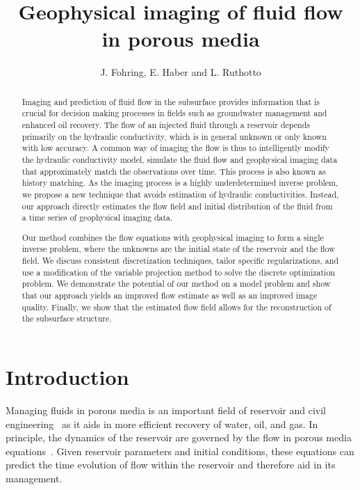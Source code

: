 \documentclass[english]{siamltex}
\begin{document}
\title{Geophysical imaging of fluid flow in porous media}
\author{J. Fohring, E. Haber and L. Ruthotto}


\maketitle
\begin{abstract}
	Imaging and prediction of fluid flow in the subsurface provides information that is crucial for decision making processes in fields such as groundwater management and enhanced oil recovery. The flow of an injected fluid through a reservoir depends primarily on the hydraulic conductivity, which is in general unknown or only known with low accuracy. A common way of imaging the flow is thus to intelligently modify the hydraulic conductivity model, simulate the fluid flow and geophysical imaging data that approximately match the observations over time. This process is also known as history matching. As the imaging process is a highly underdetermined inverse problem, we propose a new technique that avoids estimation of hydraulic conductivities. Instead, our approach directly estimates the flow field and initial distribution of the fluid from a time series of geophysical imaging data.
	
	Our method combines the flow equations with geophysical imaging  to form a single inverse problem,  where the unknowns are the initial state of the reservoir and the flow field. We discuss consistent discretization techniques, tailor specific regularizations, and use a modification of the variable projection method to solve the discrete optimization problem. We demonstrate the potential of our method on a model problem and show that our approach yields an improved flow estimate as well as an improved image quality. Finally, we show that the estimated flow field allows for the reconstruction of  the subsurface structure.

\end{abstract}
\section{Introduction} %
\label{sec:introduction}


Managing fluids in porous media is an important field
of reservoir and civil engineering~\cite{GerritsenDurlofsky2005} as it aids in 
more efficient recovery of water, oil, and gas.
In principle, the dynamics of the reservoir are governed
by the flow in porous media equations~\cite{ChenHuanMaBook}.
Given reservoir parameters and initial conditions,
these equations can predict the time evolution of flow within the
reservoir and therefore aid in its management.
 
\end{document}
